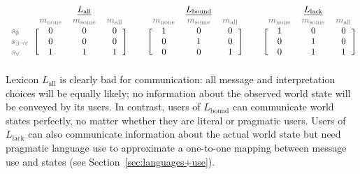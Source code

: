 \documentclass[a4paper, 11pt]{article}
\theoremstyle{Satz}
\newcommand{\state}{\ensuremath{s}\xspace}		%
\newcommand{\mystate}[1]{\ensuremath{\state_{\text{#1}}}\xspace} %
\newcommand{\mylang}[1]{\ensuremath{L_{\text{#1}}}\xspace} %
\newcommand{\messg}{\ensuremath{m}\xspace}		%
\newcommand{\mymessg}[1]{\ensuremath{\messg_{\text{#1}}}\xspace} %
\newcommand{\ssome}{\mystate{\ensuremath{\exists\neg\forall}}}
\newcommand{\sall}{\mystate{\ensuremath{\forall}}}
\newcommand{\snone}{\mystate{\ensuremath{\emptyset}}}
\newcommand{\msome}{\mymessg{some}}
\newcommand{\mall}{\mymessg{all}}
\newcommand{\mnone}{\mymessg{none}}
\newcommand{\Lall}{\mylang{all}}
\newcommand{\Lbound}{\mylang{bound}}
\newcommand{\Llack}{\mylang{lack}}
\newcommand{\mygray}[1]{{\textcolor{mygray}{#1}}}
\begin{document}
\begin{align*}
  \begin{blockarray}{lccc}
    & & \underline{\Lall} & \\
    & \mygray{\mnone} & \mygray{\msome} & \mygray{\mall} \\
    \begin{block}{l[ccc]}
     \mygray{\snone}  & 0 & 0 & 0\\
     \mygray{\ssome}  & 0 & 0 & 0\\
    \mygray{\sall}   & 1 & 1 & 1\\
    \end{block}
  \end{blockarray} & &
 \begin{blockarray}{lccc}
    & & \underline{\Lbound} & \\
    & \mygray{\mnone} & \mygray{\msome} & \mygray{\mall} \\
    \begin{block}{l[ccc]}
       & 1 & 0 & 0\\
       & 0 & 1 & 0\\
       & 0 & 0 & 1\\
    \end{block}
  \end{blockarray} & &
  \begin{blockarray}{lccc}
    & & \underline{\Llack} & \\
    & \mygray{\mnone} & \mygray{\msome} & \mygray{\mall} \\
    \begin{block}{l[ccc]}
       & 1 & 0 & 0\\
       & 0 & 1 & 0\\
       & 0 & 1 & 1\\
    \end{block}
  \end{blockarray}
\end{align*}
Lexicon $\Lall$ is clearly bad for communication: all message and interpretation choices will
be equally likely; no information about the observed world state will be conveyed
by its users. In contrast, users of $\Lbound$ can communicate world states perfectly, no matter
whether they are literal or pragmatic users. Users of $\Llack$ can also communicate information
about the actual world state but need pragmatic language use to approximate a one-to-one
mapping between message use and states (see Section~\ref{sec:languages+use}).  
\end{document}

